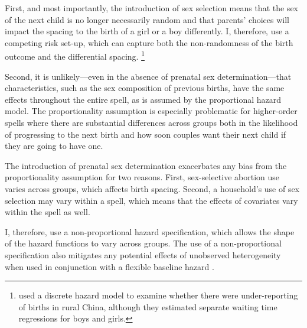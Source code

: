 \documentclass[12pt,letterpaper]{article}
\begin{document}
First, and most importantly, the introduction of sex selection means that the sex of the 
next child is no longer necessarily random and that parents' choices will impact the 
spacing to the birth of a girl or a boy differently.
I, therefore, use a competing risk set-up, which can capture both the non-randomness of
the birth outcome and the differential spacing.%
\footnote{
\cite{Merli2000} used a discrete hazard model to examine whether 
there were under-reporting of births in rural China, although they 
estimated separate waiting time regressions for boys and girls.
}

Second, it is unlikely---even in the absence of prenatal sex determination---that 
characteristics, such as the sex composition of previous births, have the same effects 
throughout the entire spell, as is assumed by the proportional hazard model.
The proportionality assumption is especially problematic for higher-order spells where 
there are substantial differences across groups both in the likelihood of progressing to 
the next birth and how soon couples want their next child if they are going to have one.

The introduction of prenatal sex determination exacerbates any bias from
the proportionality assumption for two reasons. 
First, sex-selective abortion use varies across groups, which affects birth spacing. 
Second,
a household's use of sex selection may vary within a spell, which means
that the effects of covariates vary within the spell as well.

I, therefore, use a non-proportional hazard specification, which allows the shape of the 
hazard functions to vary across groups.
The use of a non-proportional specification also mitigates any potential effects 
of unobserved heterogeneity when used in conjunction with a flexible baseline hazard 
\citep{Dolton1995}.
\end{document}

